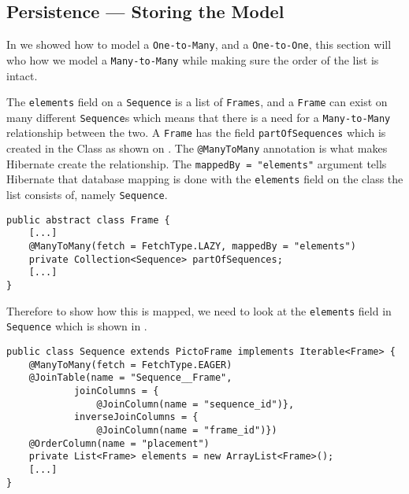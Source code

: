 \subsection{Persistence --- Storing the Model}
In  we showed how to model a \texttt{One-to-Many}, and a \texttt{One-to-One}, this section will who how we model a \texttt{Many-to-Many} while making sure the order of the list is intact.

The \texttt{elements} field on a \texttt{Sequence} is a list of \texttt{Frames}, and a \texttt{Frame} can exist on many different \texttt{Sequence}s which means that there is a need for a \texttt{Many-to-Many} relationship between the two.
A \texttt{Frame} has the field \texttt{partOfSequences} which is created in the Class as shown on .
The \texttt{@ManyToMany} annotation is what makes Hibernate create the relationship.
The \texttt{mappedBy = "elements"} argument tells Hibernate that database mapping is done with the \texttt{elements} field on the class the list consists of, namely \texttt{Sequence}.

\begin{lstlisting}[float, floatplacement=H, caption={The field \texttt{partOfSequences} in the \texttt{Frame} class. \texttt{[...]} denotes omitted code.},label={lst:frame-sequence}]
public abstract class Frame {
	[...]
    @ManyToMany(fetch = FetchType.LAZY, mappedBy = "elements")
    private Collection<Sequence> partOfSequences;
    [...]
}
\end{lstlisting}

Therefore to show how this is mapped, we need to look at the \texttt{elements} field in \texttt{Sequence} which is shown in .

\begin{lstlisting}[float, floatplacement=H, caption={The field elements in the \texttt{Sequence} class. \texttt{[...]} denotes omitted code.},label={lst:sequnce-frame}]
public class Sequence extends PictoFrame implements Iterable<Frame> {
    @ManyToMany(fetch = FetchType.EAGER)
    @JoinTable(name = "Sequence__Frame",
            joinColumns = {
                @JoinColumn(name = "sequence_id")},
            inverseJoinColumns = {
                @JoinColumn(name = "frame_id")})
    @OrderColumn(name = "placement")
    private List<Frame> elements = new ArrayList<Frame>();
    [...]
}
\end{lstlisting}

